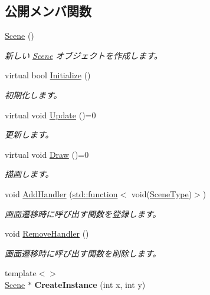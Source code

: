 \subsection*{公開メンバ関数}
\begin{DoxyCompactItemize}
\item 
\hyperlink{class_scene_ad10176d75a9cc0da56626f682d083507}{Scene} ()
\begin{DoxyCompactList}\small\item\em 新しい \hyperlink{class_scene}{Scene} オブジェクトを作成します。\end{DoxyCompactList}\item 
virtual bool \hyperlink{class_scene_a7fce113f1a210a5b1998c2976171be40}{Initialize} ()
\begin{DoxyCompactList}\small\item\em 初期化します。\end{DoxyCompactList}\item 
virtual void \hyperlink{class_scene_ab99ec7aff3ed995985ddb764ffb78f8e}{Update} ()=0
\begin{DoxyCompactList}\small\item\em 更新します。\end{DoxyCompactList}\item 
virtual void \hyperlink{class_scene_a8680672fd30bb4b345e6fab918e31ecd}{Draw} ()=0
\begin{DoxyCompactList}\small\item\em 描画します。\end{DoxyCompactList}\item 
void \hyperlink{class_scene_af81e321ee8f0659fcbeed78eaf5488f4}{Add\+Handler} (\hyperlink{classstd_1_1function}{std\+::function}$<$ void(\hyperlink{_scene_base_8h_a006282dc9ad93696316e776700c3c948}{Scene\+Type})$>$)
\begin{DoxyCompactList}\small\item\em 画面遷移時に呼び出す関数を登録します。\end{DoxyCompactList}\item 
void \hyperlink{class_scene_ab827f04d0f304f68d3b12c4a475d86c5}{Remove\+Handler} ()
\begin{DoxyCompactList}\small\item\em 画面遷移時に呼び出す関数を削除します。\end{DoxyCompactList}\item 
{\footnotesize template$<$$>$ }\\\hyperlink{class_scene}{Scene} $\ast$ {\bfseries Create\+Instance} (int x, int y)\hypertarget{class_scene_aecc957f3e96fdc9f0fdf2f644c12f42a}{}\label{class_scene_aecc957f3e96fdc9f0fdf2f644c12f42a}

\end{DoxyCompactItemize}
